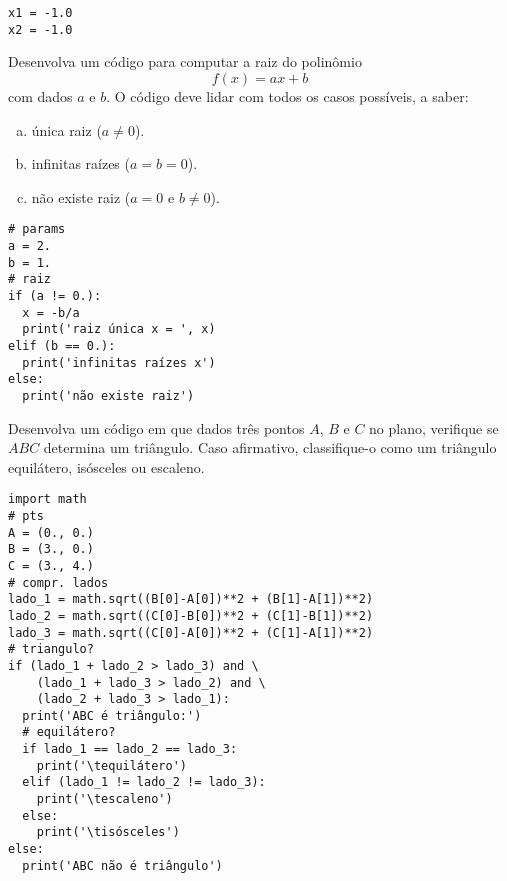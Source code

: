 \begin{verbatim}
x1 = -1.0
x2 = -1.0
\end{verbatim}

\begin{exer}
  Desenvolva um código para computar a raiz do polinômio
  \begin{equation}
    f(x) = ax + b
  \end{equation}
  com dados $a$ e $b$. O código deve lidar com todos os casos possíveis, a saber:
  \begin{enumerate}[a)]
    \item única raiz ($a\neq 0$).
    \item infinitas raízes ($a=b=0$).
    \item não existe raiz ($a = 0$ e $b \neq 0$).
  \end{enumerate}
\end{exer}
\begin{resp}

\begin{lstlisting}
# params
a = 2.
b = 1.
# raiz
if (a != 0.):
  x = -b/a
  print('raiz única x = ', x)
elif (b == 0.):
  print('infinitas raízes x')
else:
  print('não existe raiz')
\end{lstlisting}

\end{resp}

\begin{exer}
  Desenvolva um código em que dados três pontos $A$, $B$ e $C$ no plano, verifique se $ABC$ determina um triângulo. Caso afirmativo, classifique-o como um triângulo equilátero, isósceles ou escaleno.
\end{exer}
\begin{resp}

\begin{lstlisting}
import math
# pts
A = (0., 0.)
B = (3., 0.)
C = (3., 4.)
# compr. lados
lado_1 = math.sqrt((B[0]-A[0])**2 + (B[1]-A[1])**2)
lado_2 = math.sqrt((C[0]-B[0])**2 + (C[1]-B[1])**2)
lado_3 = math.sqrt((C[0]-A[0])**2 + (C[1]-A[1])**2)
# triangulo?
if (lado_1 + lado_2 > lado_3) and \
    (lado_1 + lado_3 > lado_2) and \
    (lado_2 + lado_3 > lado_1):
  print('ABC é triângulo:')
  # equilátero?
  if lado_1 == lado_2 == lado_3:
    print('\tequilátero')
  elif (lado_1 != lado_2 != lado_3):
    print('\tescaleno')
  else:
    print('\tisósceles')
else:
  print('ABC não é triângulo')
\end{lstlisting}

\end{resp}

